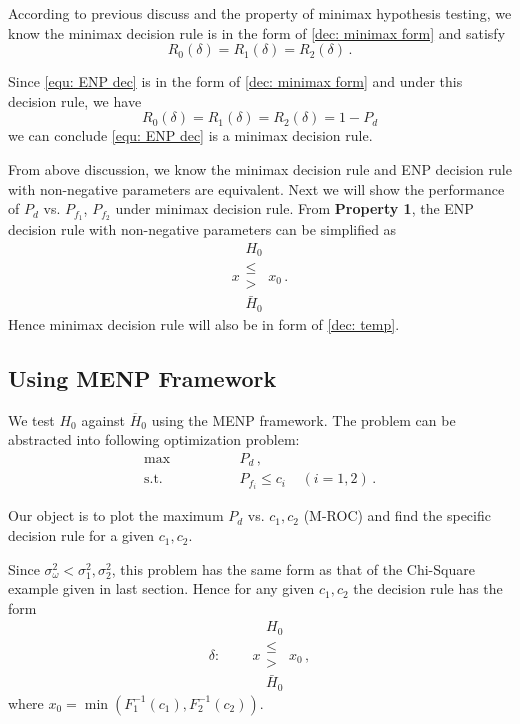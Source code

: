 \documentclass[12pt,journal,a4paper,twoside,onecolumn]{IEEEtran}
\begin{document}
\begin{spacing}{2.5}
According to previous discuss and the property of minimax hypothesis testing, we know the minimax decision rule is in the form of \eqref{dec: minimax form} and satisfy 
\begin{equation}
\label{condition}
R_0(\delta) = R_1(\delta) = R_2(\delta)\,.
\end{equation}

Since \eqref{equ: ENP dec} is in the form of \eqref{dec: minimax form} and under this decision rule, we have 
\begin{equation}
\label{R0}
R_0(\delta) = R_1(\delta) = R_2(\delta) = 1- P_d
\end{equation}
we can conclude \eqref{equ: ENP dec} is a minimax decision rule. 

From above discussion, we know the minimax decision rule and ENP decision rule with non-negative parameters are equivalent. 
Next we will show the performance of $P_d$ vs. $P_{f_1}$, $P_{f_2}$ under minimax decision rule. From \textbf{Property 1}, the ENP decision rule with non-negative parameters can be simplified as
\begin{equation}
\label{dec: temp}
x \substack{H_0 \\ \leq \\ > \\ \bar{H}_0} x_0\,.
\end{equation}
Hence minimax decision rule will also be in form of \eqref{dec: temp}. 

\subsection{Using MENP Framework}

We test $H_0$ against $\overline{H}_0$ using the MENP framework. The problem can be abstracted into following optimization problem:
\begin{equation}
  \label{equ: energy spectrum sensing}
  \begin{split}
  \max \;\;\;\;\;\;\;\;\;\;\;\;\;\;\; &P_d\,,\\
  \text{s.t.} \;\;\;\;\;\;\;\;\;\;\;\;\;\;\; &P_{f_i} \leq c_i\;\;\;\;(i = 1, 2)\,.
  \end{split}
\end{equation}

Our object is to plot the maximum $P_d$ vs. $c_1, c_2$ (M-ROC) and find the specific decision rule for a given $c_1, c_2$.

Since $\sigma_\omega^2 < \sigma_1^2, \sigma_2^2$, this problem has the same form as that of the Chi-Square example given in last section.
Hence for any given $c_1, c_2$ the decision rule has the form
\begin{equation}
\label{equ: decision rule for spectrum sensing}
\delta:\;\;\;\;\;\;\;\; x \substack{H_0 \\ \leq \\ > \\\bar{H}_0} x_0\,,
 \end{equation}
where $x_0 = \min(F_1^{-1}(c_1), F_2^{-1}(c_2))$.


\end{spacing}
\end{document}
